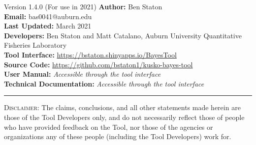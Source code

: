\begin{bclogo}[margeG=-1.5,margeD=-1.5,logo=\hspace{17pt},couleurBarre=black, noborder=false,couleur=light-grey]{Version 1.4.0 (For use in 2021)}
   \textbf{Author:} Ben Staton \\[3pt]
   \textbf{Email:} bas0041@auburn.edu \\[3pt]
   \textbf{Last Updated:} March 2021 \\[3pt]
   \textbf{Developers:} Ben Staton and Matt Catalano, Auburn University Quantitative Fisheries Laboratory \\[3pt]
   \textbf{Tool Interface:} \url{https://bstaton.shinyapps.io/BayesTool} \\[3pt]
   \textbf{Source Code:} \url{https://github.com/bstaton1/kusko-bayes-tool} \\[3pt]
   \textbf{User Manual:} \textit{Accessible through the tool interface} \\[3pt]
   \textbf{Technical Documentation:} \textit{Accessible through the tool interface}
  \hrule
  \footnotesize{\textsc{Disclaimer}: The claims, conclusions, and all other statements made herein are those of the Tool Developers only, and do not necessarily reflect those of people who have provided feedback on the Tool, nor those of the agencies or organizations any of these people (including the Tool Developers) work for}.
\end{bclogo}
